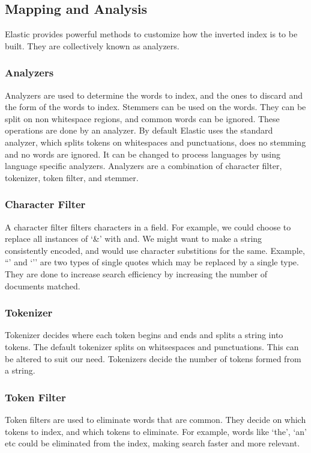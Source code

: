 \documentclass[12pt]{article}
\begin{document}
		\subsection{Mapping and Analysis}
			Elastic provides powerful methods to customize how the inverted index is to be built. They are collectively known as analyzers.

			\subsubsection{Analyzers}
				Analyzers are used to determine the words to index, and the ones to discard and the form of the words to index. Stemmers can be used on the words. They can be split on non whitespace regions, and common words can be ignored. These operations are done by an analyzer. By default Elastic uses the standard analyzer, which splits tokens on whitespaces and punctuations, does no stemming and no words are ignored. It can be changed to process languages by using language specific analyzers. Analyzers are a combination of character filter, tokenizer, token filter, and stemmer.

			\subsubsection{Character Filter}
				A character filter filters characters in a field. For example, we could choose to replace all instances of `\&' with and. We might want to make a string consistently encoded, and would use character substitions for the same. Example, ``' and `'' are two types of single quotes which may be replaced by a single type. They are done to increase search efficiency by increasing the number of documents matched.

			\subsubsection{Tokenizer}
				Tokenizer decides where each token begins and ends and splits a string into tokens. The default tokenizer splits on whitsespaces and punctuations. This can be altered to suit our need. Tokenizers decide the number of tokens formed from a string.

			\subsubsection{Token Filter}
				Token filters are used to eliminate words that are common. They decide on which tokens to index, and which tokens to eliminate. For example, words like `the', `an' etc could be eliminated from the index, making search faster and more relevant. 
\end{document}
